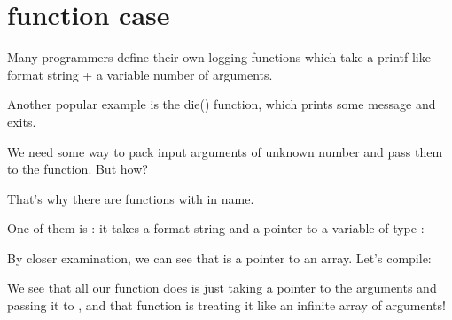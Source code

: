 \section{ function case}

Many programmers define their own logging functions which take a printf-like format string + 
a variable number of arguments.

Another popular example is the die() function, which prints some message and exits.

We need some way to pack input arguments of unknown number and pass them to the \printf function.
But how?

That's why there are functions with  in name.

One of them is : it takes a format-string and a pointer to a variable of type :



By closer examination, we can see that  is a pointer to an array.
Let's compile:



We see that all our function does is just taking a pointer to the arguments and
passing it to , and that function is treating it like an infinite array of arguments!


